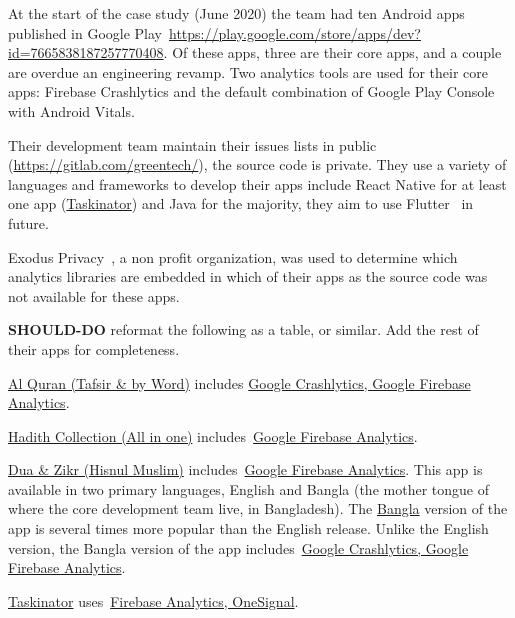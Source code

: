 At the start of the case study (June 2020) the team had ten Android apps published in Google Play~\url{https://play.google.com/store/apps/dev?id=7665838187257770408}. Of these apps, three are their core apps, and a couple are overdue an engineering revamp.  Two analytics tools are used for their core apps: Firebase Crashlytics and the default combination of Google Play Console with Android Vitals.

Their development team maintain their issues lists in public (\url{https://gitlab.com/greentech/}), the source code is private. They use a variety of languages and frameworks to develop their apps include React Native for at least one app (\href{https://play.google.com/store/apps/details?id=com.taskinator}{Taskinator}) and Java for the majority, they aim to use Flutter~\cite{flutter_dev_site} in future.

Exodus Privacy~\cite{exodus_privacy_project}, a non profit organization, was used to determine which analytics libraries are embedded in which of their apps as the source code was not available for these apps.

\textbf{SHOULD-DO} reformat the following as a table, or similar. Add the rest of their apps for completeness.

\href{https://play.google.com/store/apps/details?id=com.greentech.quran}{Al Quran (Tafsir \& by Word)} includes \href{https://reports.exodus-privacy.eu.org/en/reports/com.greentech.quran/latest/}{Google Crashlytics, Google Firebase Analytics}.

\href{https://play.google.com/store/apps/details?id=com.greentech.hadith}{	
Hadith Collection (All in one)} includes~\href{https://reports.exodus-privacy.eu.org/en/reports/77502/}{Google Firebase Analytics}.

\href{https://play.google.com/store/apps/details?id=com.greentech.hisnulmuslim}{	
Dua \& Zikr (Hisnul Muslim)} includes~\href{https://reports.exodus-privacy.eu.org/en/reports/54714/}{Google Firebase Analytics}. This app is available in two primary languages, English and Bangla (the mother tongue of where the core development team live, in Bangladesh). The \href{https://play.google.com/store/apps/details?id=com.greentech.hisnulmuslimbn}{Bangla} version of the app is several times more popular than the English release. Unlike the English version, the Bangla version of the app includes~\href{https://reports.exodus-privacy.eu.org/en/reports/146430/}{Google Crashlytics, Google Firebase Analytics}.

\href{https://play.google.com/store/apps/details?id=com.taskinator}{Taskinator} uses~\href{https://reports.exodus-privacy.eu.org/en/reports/146496/}{Firebase Analytics, OneSignal}.


